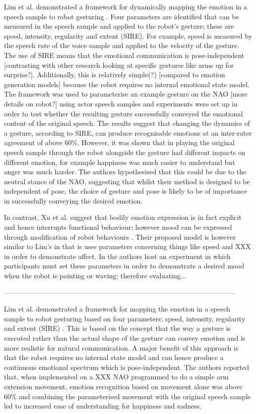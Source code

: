 \documentclass[11pt]{article}
\begin{document}
Lim et al. demonstrated a framework for dynamically mapping the emotion in a speech sample to robot gesturing \cite{lim2011converting}. Four parameters are identified that can be measured in the speech sample and applied to the robot's gesture; these are speed, intensity, regularity and extent (SIRE). For example, speed is measured by the speech rate of the voice sample and applied to the velocity of the gesture. The use of SIRE means that the emotional communication is pose-independent [contrasting with other research looking at specific gestures like arms up for surprise?]. Additionally, this is relatively simple(?) [compared to emotion generation models] because the robot requires no internal emotional state model. The framework was used to parameterise an example gesture on the NAO [more details on robot?] using actor speech samples and experiments were set up in order to test whether the resulting gesture successfully conveyed the emotional content of the original speech. The results suggest that changing the dynamics of a gesture, according to SIRE, can produce recognisable emotions at an inter-rater agreement of above 60\%. However, it was shown that in playing the original speech sample through the robot alongside the gesture had different impacts on different emotion, for example happiness was much easier to understand but anger was much harder. The authors hypothesised that this could be due to the neutral stance of the NAO, suggesting that whilst their method is designed to be independent of pose, the choice of gesture and pose is likely to be of importance in successfully conveying the desired emotion.

In contrast, Xu et al. suggest that bodily emotion expression is in fact explicit and hence interrupts functional behaviour; however mood can be expressed through modification of robot behaviours \cite{xu2013mood}. Their proposed model is however similar to Lim's in that is uses parameters concerning things like speed and XXX in order to demonstrate affect. In \cite{xu2013mood} the authors host an experiment in which participants must set these parameters in order to demonstrate a desired mood when the robot is pointing or waving; therefore evaluating...  

-----------------------------------------------------------------------------------------------------


Lim et al. demonstrated a framework for mapping the emotion in a speech sample to robot gesturing based on four parameters;  speed, intensity, regularity and extent (SIRE) \cite{lim2011converting}. This is based on the concept that the way a gesture is executed rather than the actual shape of the gesture can convey emotion and is more realistic for natural communication. A major benefit of this approach is that the robot requires no internal state model and can hence produce a continuous emotional spectrum which is pose-independent. The authors reported that, when implemented on a XXX NAO programmed to do a simple arm extension movement, emotion recognition based on movement alone was above 60\% and combining the parameterised movement with the original speech sample led to increased ease of understanding for happiness and sadness.   
\end{document}
